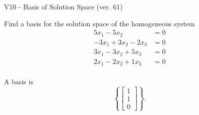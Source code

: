 \begin{exercise}
  \begin{exerciseTitle}V10 - Basis of Solution Space (ver. 61)\end{exerciseTitle}
  \begin{exerciseStatement}
    Find a basis for the solution space of the homogeneous system 
\begin{align*}
 5 x_ 1 -5 x_ 2 &= 0  \\ 
  -3 x_ 1 + 3 x_ 2 -2 x_ 3 &= 0  \\ 
  3 x_ 1 -3 x_ 2 + 5 x_ 3 &= 0  \\ 
  2 x_ 1 -2 x_ 2 + 1 x_ 3 &= 0  \\ 
 \end{align*}


 
  \end{exerciseStatement}

  \begin{exerciseAnswer}
   A basis is   
\[\left\{\left[\begin{array}{c}
1 \\
1 \\
0
\end{array}\right]\right\}.\]

  


  \end{exerciseAnswer}
\end{exercise}
